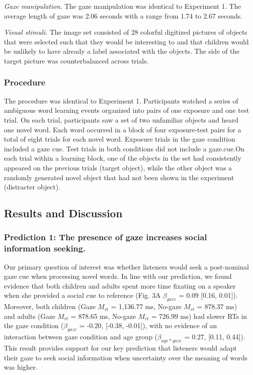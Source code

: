 \documentclass[10pt, letterpaper]{article}
\begin{document}
\emph{Gaze manipulation}. The gaze manipulation was identical to
Experiment 1. The average length of gaze was 2.06 seconds with a range
from 1.74 to 2.67 seconds.

\emph{Visual stimuli.} The image set consisted of 28 colorful digitized
pictures of objects that were selected such that they would be
interesting to and that children would be unlikely to have already a
label associated with the objects. The side of the target picture was
counterbalanced across trials.

\hypertarget{procedure-1}{%
\subsubsection{Procedure}\label{procedure-1}}

The procedure was identical to Experiment 1. Participants watched a
series of ambiguous word learning events organized into pairs of one
exposure and one test trial. On each trial, participants saw a set of
two unfamiliar objects and heard one novel word. Each word occurred in a
block of four exposure-test pairs for a total of eight trials for each
novel word. Exposure trials in the gaze condition included a gaze cue.
Test trials in both conditions did not include a gaze.cue.On each trial
within a learning block, one of the objects in the set had consistently
appeared on the previous trials (target object), while the other object
was a randomly generated novel object that had not been shown in the
experiment (distracter object).

\hypertarget{results-and-discussion-1}{%
\subsection{Results and Discussion}\label{results-and-discussion-1}}

\hypertarget{prediction-1-the-presence-of-gaze-increases-social-information-seeking.}{%
\subsubsection{Prediction 1: The presence of gaze increases social
information
seeking.}\label{prediction-1-the-presence-of-gaze-increases-social-information-seeking.}}

Our primary question of interest was whether listeners would seek a
post-nominal gaze cue when processing novel words. In line with our
prediction, we found evidence that both children and adults spent more
time fixating on a speaker when she provided a social cue to reference
(Fig. 3A \(\beta_{gaze}\) = 0.09 {[}0.16, 0.01{]}). Moreover, both
children (Gaze \(M_{rt}\) = 1,136.77 ms, No-gaze \(M_{rt}\) = 878.37 ms)
and adults (Gaze \(M_{rt}\) = 878.65 ms, No-gaze \(M_{rt}\) = 726.99 ms)
had slower RTs in the gaze condition (\(\beta_{gaze}\) = -0.20,
{[}-0.38, -0.01{]}), with no evidence of an interaction between gaze
condition and age group (\(\beta_{age*gaze}\) = 0.27, {[}0.11, 0.44{]}).
This result provides support for our key prediction that listeners would
adapt their gaze to seek social information when uncertainty over the
meaning of words was higher.
\end{document}
